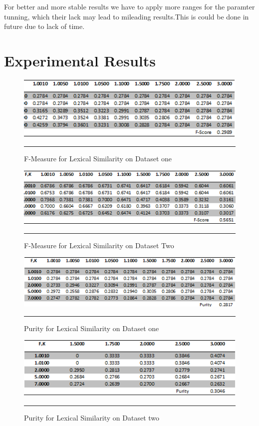 For better and more stable results we have to apply more ranges for the paramter tunning, which their lack may lead to mileading results.This is could be done in future due to lack of time.


\section{Experimental Results}
\label{tables}
\begin{figure}[htbp]
	\centering
		\includegraphics{./Figures/lexical_F_DS1.png}
		\rule{35em}{0.5pt}
	\caption[F-Measure for Lexical Similarity on Dataset one]{F-Measure for Lexical Similarity on Dataset one}
	\label{fig:purity1}
\end{figure}

\begin{figure}[htbp]
	\centering
		\includegraphics{./Figures/lexical_F_DS2.png}
		\rule{35em}{0.5pt}
	\caption[F-Measure for Lexical Similarity on Dataset Two]{F-Measure for Lexical Similarity on Dataset Two}
	\label{fig:purity2}
\end{figure}

\begin{figure}[htbp]
	\centering
		\includegraphics{./Figures/lexical_Purity_DS1.png}
		\rule{35em}{0.5pt}
	\caption[Purity for Lexical Similarity on Dataset one]{Purity for Lexical Similarity on Dataset one}
	\label{fig:purity3}
\end{figure}

\begin{figure}[htbp]
	\centering
		\includegraphics{./Figures/lexical_Purity_DS2.png}
		\rule{35em}{0.5pt}
	\caption[Purity for Lexical Similarity on Dataset two]{Purity for Lexical Similarity on Dataset two}
	\label{fig:purity4}
\end{figure}

